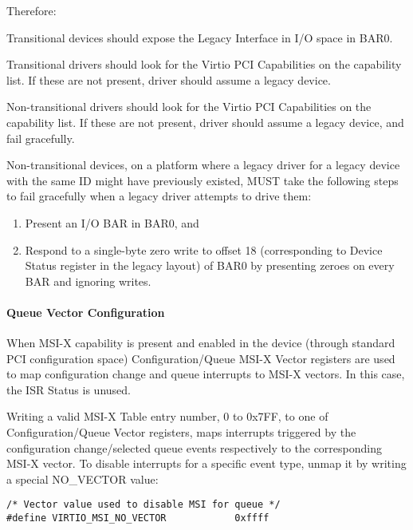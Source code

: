 Therefore:

Transitional devices should expose the Legacy Interface in I/O
space in BAR0.

Transitional drivers should look for the Virtio PCI
Capabilities on the capability list.
If these are not present, driver should assume a legacy device.

Non-transitional drivers should look for the Virtio PCI
Capabilities on the capability list.
If these are not present, driver should assume a legacy device,
and fail gracefully.

Non-transitional devices, on a platform where a legacy driver for
a legacy device with the same ID might have previously existed,
MUST take the following steps to fail gracefully when a legacy
driver attempts to drive them:

\begin{enumerate}
\item Present an I/O BAR in BAR0, and
\item Respond to a single-byte zero write to offset 18
   (corresponding to Device Status register in the legacy layout)
   of BAR0 by presenting zeroes on every BAR and ignoring writes.
\end{enumerate}

\paragraph{Queue Vector Configuration}\label{sec:Virtio Transport Options / Virtio Over PCI Bus / PCI-specific Initialization And Device Operation / Device Initialization / Queue Vector Configuration}

When MSI-X capability is present and enabled in the device
(through standard PCI configuration space) Configuration/Queue
MSI-X Vector registers are used to map configuration change and queue
interrupts to MSI-X vectors. In this case, the ISR Status is unused.

Writing a valid MSI-X Table entry number, 0 to 0x7FF, to one of
Configuration/Queue Vector registers, maps interrupts triggered
by the configuration change/selected queue events respectively to
the corresponding MSI-X vector. To disable interrupts for a
specific event type, unmap it by writing a special NO_VECTOR
value:

\begin{lstlisting}
/* Vector value used to disable MSI for queue */
#define VIRTIO_MSI_NO_VECTOR            0xffff
\end{lstlisting}

